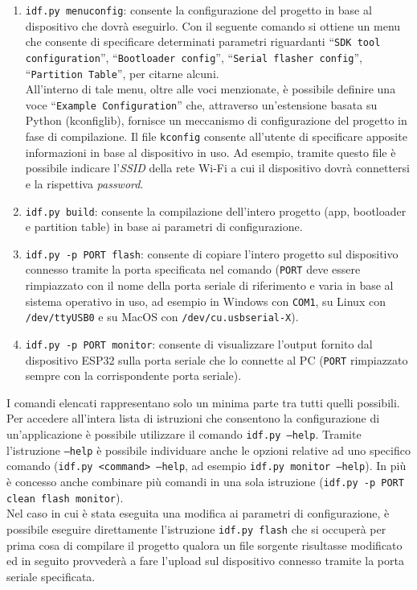 \begin{enumerate}
    \item \texttt{idf.py menuconfig}: consente la configurazione del progetto in base al dispositivo che dovrà eseguirlo. Con il seguente comando si ottiene un menu che consente di specificare determinati parametri riguardanti ``\texttt{SDK tool configuration}'', ``\texttt{Bootloader config}'', ``\texttt{Serial flasher config}'', ``\texttt{Partition Table}'', per citarne alcuni. \\
    All'interno di tale menu, oltre alle voci menzionate, è possibile definire una voce ``\texttt{Example Configuration}'' che, attraverso un'estensione basata su Python (kconfiglib), fornisce un meccanismo di configurazione del progetto in fase di compilazione. Il file \texttt{kconfig} consente all'utente di specificare apposite informazioni in base al dispositivo in uso. Ad esempio, tramite questo file è possibile indicare l'\textit{SSID} della rete Wi-Fi a cui il dispositivo dovrà connettersi e la rispettiva \textit{password}.
    
    \item \texttt{idf.py build}: consente la compilazione dell'intero progetto (app, bootloader e partition table) in base ai parametri di configurazione. 
    
    \item \texttt{idf.py -p PORT flash}: consente di copiare l'intero progetto sul dispositivo connesso tramite la porta specificata nel comando (\texttt{PORT} deve essere rimpiazzato con il nome della porta seriale di riferimento e varia in base al sistema operativo in uso, ad esempio in Windows con \texttt{COM1}, su Linux con \texttt{/dev/ttyUSB0} e su MacOS con \texttt{/dev/cu.usbserial-X}).
    
    \item \texttt{idf.py -p PORT monitor}: consente di visualizzare l'output fornito dal dispositivo ESP32 sulla porta seriale che lo connette al PC (\texttt{PORT} rimpiazzato sempre con la corrispondente porta seriale).
\end{enumerate}

\noindent I comandi elencati rappresentano solo un minima parte tra tutti quelli possibili. Per accedere all'intera lista di istruzioni che consentono la configurazione di un'applicazione è possibile utilizzare il comando \texttt{idf.py ---help}. Tramite l'istruzione \texttt{--help} è possibile individuare anche le opzioni relative ad uno specifico comando (\texttt{idf.py <command> ---help}, ad esempio \texttt{idf.py monitor ---help}). In più è concesso anche combinare più comandi in una sola istruzione (\texttt{idf.py -p PORT clean flash monitor}).\\
Nel caso in cui è stata eseguita una modifica ai parametri di configurazione, è possibile eseguire direttamente l'istruzione \texttt{idf.py flash} che si occuperà per prima cosa di compilare il progetto qualora un file sorgente risultasse modificato ed in seguito provvederà a fare l'upload sul dispositivo connesso tramite la porta seriale specificata.\\

